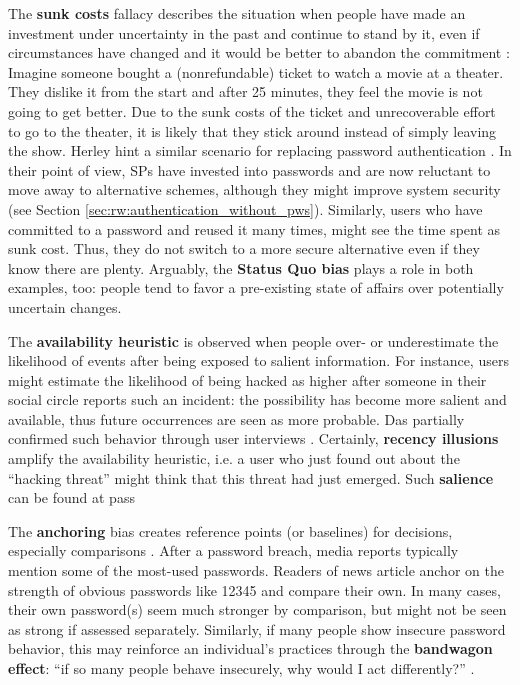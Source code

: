 	The \textbf{sunk costs} fallacy describes the situation when people have made an investment under uncertainty in the past and continue to stand by it, even if circumstances have changed and it would be better to abandon the commitment \cite{Thaler2004MentalAccounting}: Imagine someone bought a (nonrefundable) ticket to watch a movie at a theater. They dislike it from the start and after 25 minutes, they feel the movie is not going to get better. Due to the sunk costs of the ticket and unrecoverable effort to go to the theater, it is likely that they stick around instead of simply leaving the show. Herley \etal hint a similar scenario for replacing password authentication \cite{Herley2012PersistenceOfPasswords}. In their point of view, \glspl{SP} have invested into passwords and are now reluctant to move away to alternative schemes, although they might improve system security (see Section \ref{sec:rw:authentication_without_pws}). Similarly, users who have committed to a password and reused it many times, might see the time spent as sunk cost. Thus, they do not switch to a more secure alternative even if they know there are plenty. Arguably, the \textbf{Status Quo bias} plays a role in both examples, too: people tend to favor a pre-existing state of affairs over potentially uncertain changes.
	
	The \textbf{availability heuristic} is observed when people over- or underestimate the likelihood of events after being exposed to salient information. For instance, users might estimate the likelihood of being hacked as higher after someone in their social circle reports such an incident: the possibility has become more salient and available, thus future occurrences are seen as more probable. Das \etal partially confirmed such behavior through user interviews \cite{Das2014EffectSocialInfluenceSecuritySensitivity}. Certainly, \textbf{recency illusions} amplify the availability heuristic, i.e. a user who just found out about the ``hacking threat'' might think that this threat had just emerged. Such \textbf{salience} can be found at pass  %
	
	The \textbf{anchoring} bias creates reference points (or baselines) for decisions, especially comparisons \cite{Forget2007PersuasionEducationSecurity}. After a password breach, media reports typically mention some of the most-used passwords. Readers of news article anchor on the strength of obvious passwords like 12345 and compare their own. In many cases, their own password(s) seem much stronger by comparison, but might not be seen as strong if assessed separately. Similarly, if many people show insecure password behavior, this may reinforce an individual's practices through the \textbf{bandwagon effect}: ``if so many people behave insecurely, why would I act differently?'' \cite{Adams2015MindlessComputing}.
	
